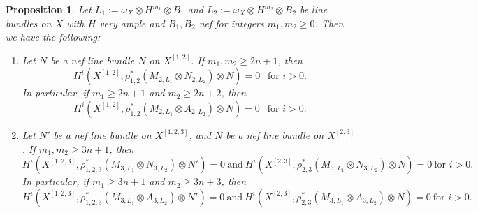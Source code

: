 \documentclass{amsart}
\theoremstyle{plain}
\newtheorem{prop}[thm]{Proposition}
\theoremstyle{definition}
\theoremstyle{remark}
\begin{document}
\begin{prop}\label{prop:mainvanishing1}
Let $L_1:=\omega_X \otimes H^{m_1} \otimes B_1$ and $L_2:=\omega_X \otimes H^{m_2} \otimes B_2$ be line bundles on $X$ with $H$ very ample and $B_1, B_2$ nef for integers $m_1, m_2 \geq 0$. Then we have the following:
\begin{enumerate}
    \item Let $N$ be a nef line bundle $N$ on $X^{[1,2]}$. If $m_1, m_2 \geq 2n+1$, then 
    $$
    H^i(X^{[1,2]}, \rho_{1,2}^* (M_{2,L_1} \otimes N_{2,L_2}) \otimes N)=0~~\text{ for $i>0$}.
    $$
    In particular, if $m_1 \geq 2n+1$ and $m_2 \geq 2n+2$, then 
     $$
    H^i(X^{[1,2]}, \rho_{1,2}^* (M_{2,L_1} \otimes A_{2,L_2}) \otimes N)=0~~\text{ for $i>0$}.
    $$
    \item Let $N'$ be a nef line bundle on $X^{[1,2,3]}$, and $N$ be a nef line bundle on $X^{[2,3]}$. If $m_1, m_2 \geq 3n+1$, then 
    $$
    H^i(X^{[1,2,3]}, \rho_{1,2,3}^* (M_{3, L_1} \otimes N_{3,L_2}) \otimes N') = 0~\text{and}~H^i(X^{[2,3]}, \rho_{2,3}^* (M_{3, L_1} \otimes N_{3,L_2}) \otimes N)=0~\text{for $i>0$}. 
    $$
    In particular, if $m_1 \geq 3n+1$ and $m_2 \geq 3n+3$, then 
    $$
    H^i(X^{[1,2,3]}, \rho_{1,2,3}^* (M_{3, L_1} \otimes A_{3,L_2}) \otimes N') = 0~\text{and}~H^i(X^{[2,3]}, \rho_{2,3}^* (M_{3, L_1} \otimes A_{3,L_2}) \otimes N)=0~\text{for $i>0$}. 
    $$
\end{enumerate}
\end{prop}
\end{document}
